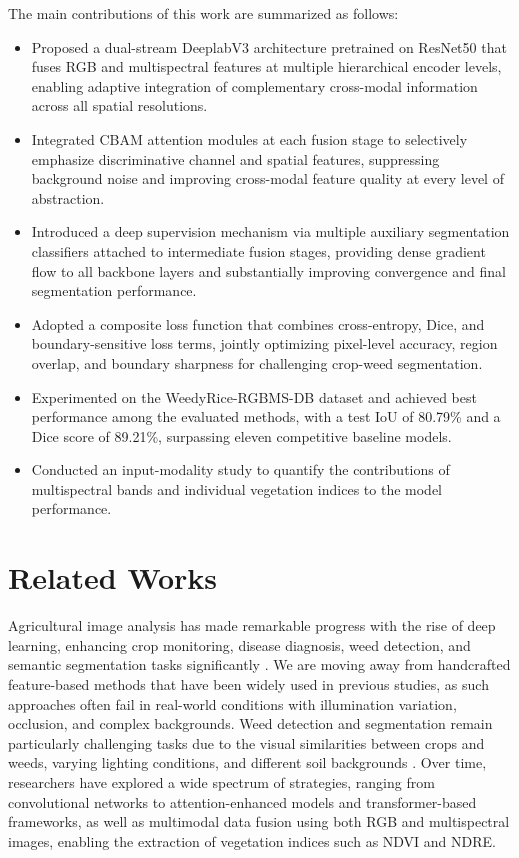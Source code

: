 \documentclass[pdflatex,sn-mathphys-num]{sn-jnl}
\newcommand{\rev}[1]{{\color{revisionblue}#1}}
\begin{document}
The main contributions of this work are summarized as follows:
\begin{itemize}
\item Proposed a dual-stream DeeplabV3 architecture pretrained on ResNet50 that fuses RGB and multispectral features at multiple hierarchical encoder levels, enabling adaptive integration of complementary cross-modal information across all spatial resolutions.
\item Integrated CBAM attention modules at each fusion stage to selectively emphasize discriminative channel and spatial features, suppressing background noise and improving cross-modal feature quality at every level of abstraction.
\item Introduced a deep supervision mechanism via multiple auxiliary segmentation classifiers attached to intermediate fusion stages, providing dense gradient flow to all backbone layers and substantially improving convergence and final segmentation performance. 
\item Adopted a composite loss function that combines cross-entropy, Dice, and boundary-sensitive loss terms, jointly optimizing pixel-level accuracy, region overlap, and boundary sharpness for challenging crop-weed segmentation.
\item Experimented on the WeedyRice-RGBMS-DB dataset and achieved best performance among the evaluated methods, with a test IoU of 80.79\% and a Dice score of 89.21\%, surpassing eleven competitive baseline models.
\item \rev{Conducted an input-modality study to quantify the contributions of multispectral bands and individual vegetation indices to the model performance.}

\end{itemize}
\section{Related Works}
Agricultural image analysis has made remarkable progress with the rise of deep learning, enhancing crop monitoring, disease diagnosis, weed detection, and semantic segmentation tasks significantly \cite{lei2024segmentationreview}. We are moving away from handcrafted feature-based methods that have been widely used in previous studies, as such approaches often fail in real-world conditions with illumination variation, occlusion, and complex backgrounds. Weed detection and segmentation remain particularly challenging tasks due to the visual similarities between crops and weeds, varying lighting conditions, and different soil backgrounds \cite{zhao2025deep,saini2025review}. Over time, researchers have explored a wide spectrum of strategies, ranging from convolutional networks to attention-enhanced models and transformer-based frameworks, as well as multimodal data fusion using both RGB and multispectral images, enabling the extraction of vegetation indices such as NDVI and NDRE.
\end{document}

